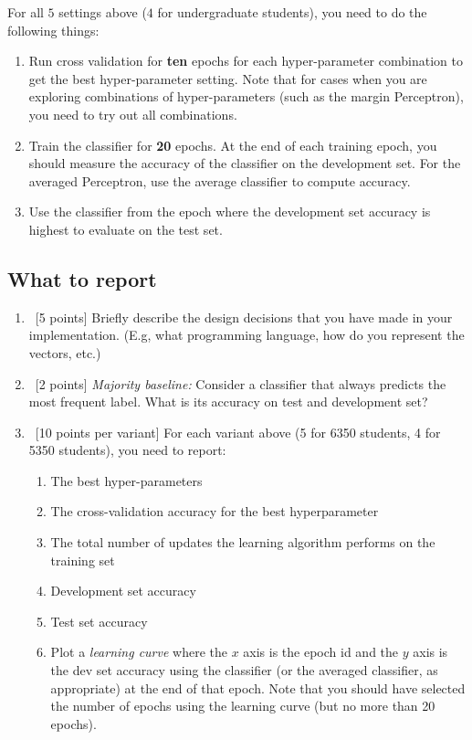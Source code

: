 For all $5$ settings above ($4$ for undergraduate students), you need to do the following things:

\begin{enumerate}
\item Run cross validation for {\bf ten} epochs for each
  hyper-parameter combination to get the best hyper-parameter
  setting. Note that for cases when you are exploring combinations of
  hyper-parameters (such as the margin Perceptron), you need to try
  out all combinations.

\item Train the classifier for {\bf 20} epochs. At the end of each
  training epoch, you should measure the accuracy of the classifier on
  the development set. For the averaged Perceptron, use the average
  classifier to compute accuracy.

\item Use the classifier from the epoch where the development set
  accuracy is highest to evaluate on the test set.
\end{enumerate}

\subsection{What to report}

\begin{enumerate}
\item~[5 points] Briefly describe the design decisions that you have
  made in your implementation. (E.g, what programming language, how do
  you represent the vectors, etc.)
\item~[2 points] {\em Majority baseline:} Consider a classifier that
  always predicts the most frequent label. What is its accuracy on
  test and development set?
\item~[10 points per variant] For each variant above (5 for 6350 students, 4 for 5350 students), you need to report:
  \begin{enumerate}
  \item The best hyper-parameters
  \item The cross-validation accuracy for the best hyperparameter 
  \item The total number of updates the learning algorithm performs on the training set
  \item Development set accuracy
  \item Test set accuracy
  \item Plot a {\em learning curve} where the $x$ axis is the epoch id
    and the $y$ axis is the dev set accuracy using the classifier (or
    the averaged classifier, as appropriate) at the end of that
    epoch. Note that you should have selected the number of epochs
    using the learning curve (but no more than 20 epochs).
  \end{enumerate}
\end{enumerate}

